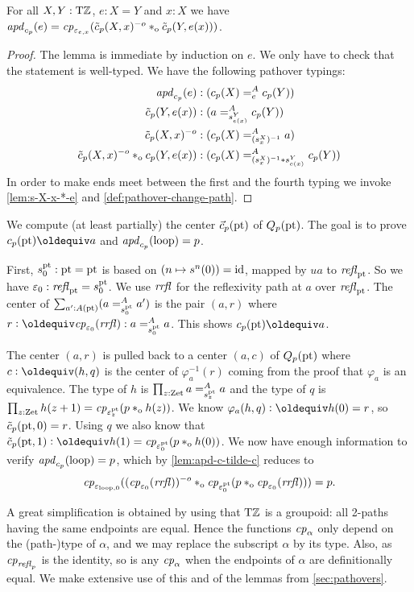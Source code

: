 \documentclass[a4,12pt]{amsart}
\begin{document}
\begin{lemma}\label{lem:apd-c-tilde-c}
For all $X,Y:{\mathrm{T}\mathbb{Z}}$, $e: X=Y$ and $x:X$ we have
$\mathop{{\it apd}_{c_p}}(e) = \mathit{cp}_{\varepsilon_{e,x}}
(\tilde c_p(X,x)^{-o}*_{\mathrm{o}} \tilde c_p(Y,e(x)))$.
\end{lemma}
\begin{proof}
The lemma is immediate by induction on $e$.
We only have to check that the statement is well-typed.
We have the following pathover typings:
\begin{align*}
\mathop{{\it apd}_{c_p}}(e) &: (c_p(X) =^A_e c_p(Y))\\
\tilde c_p(Y,e(x)) &:  (a =^A_{s^Y_{e(x)}} c_p(Y))\\
\tilde c_p(X,x)^{-o} &: (c_p(X) =^A_{(s^X_x)^{-1}} a)\\
\tilde c_p(X,x)^{-o} *_{\mathrm{o}} c_p(Y,e(x)) &: 
     (c_p(X) =^A_{(s^X_x)^{-1}* s^Y_{e(x)}} c_p(Y))\\
\end{align*}
In order to make ends meet between the first and the fourth typing
we invoke \cref{lem:s-X-x-*-e} and \cref{def:pathover-change-path}.
\end{proof}

We compute (at least partially) the center $\vec c_p({\mathord{\mathrm{pt}}})$ of $Q_p({\mathord{\mathrm{pt}}})$.
The goal is to prove $c_p(\pt)\jdeq a$ and $\mathop{{\it apd}_{c_p}}(\mathrm{loop})=p$.

First, $s^{\mathord{\mathrm{pt}}}_0: {\mathord{\mathrm{pt}}} = {\mathord{\mathrm{pt}}}$ is based on $(n\mapsto s^n(0)) = \mathord{\mathrm{id}}$, 
mapped by $ua$ to $\mathop{{\it refl}_{{\mathord{\mathrm{pt}}}}}$. So we have $\varepsilon_0 : \mathop{{\it refl}_{{\mathord{\mathrm{pt}}}}} = s^{\mathord{\mathrm{pt}}}_0$.
We use $\mathit{rrfl}$ for the reflexivity path at $a$ over $\mathop{{\it refl}_{{\mathord{\mathrm{pt}}}}}$.
The center of $\sum_{a':A({\mathord{\mathrm{pt}}})} (a =^A_{s^{\mathord{\mathrm{pt}}}_0} a')$ is the pair
$(a,r)$ where $r \defeq \cp{\varepsilon_0}(\rrfl): a =^A_{s^\pt_0} a$.
This shows $c_p(\pt)\jdeq a$.

The center $(a,r)$ is pulled back to a center $(a,c)$ of $Q_p({\mathord{\mathrm{pt}}})$ 
where $c\defeq(h,q)$ is the center of $\varphi_{a}^{-1}(r)$ coming 
from the proof that $\varphi_{a}$ is an equivalence.
The type of $h$ is $\prod_{z:\mathrm{Zet}} a =^A_{s^{\mathord{\mathrm{pt}}}_z} a$ and
the type of $q$ is $\prod_{z:\mathrm{Zet}} h(z+1) = \mathit{cp}_{\varepsilon^{\mathord{\mathrm{pt}}}_z}(p *_{\mathrm{o}} h(z))$.
We know $\varphi_{a}(h,q) \defeq h(0) = r$, so $\tilde c_p({\mathord{\mathrm{pt}}},0) = r$.
Using $q$ we also know that 
$\tilde c_p(\pt,1) \defeq h(1) = \cp{\varepsilon^\pt_0}(p \cto h(0))$.
We now have enough information to verify $\mathop{{\it apd}_{c_p}}(\mathrm{loop})=p$,
which by \cref{lem:apd-c-tilde-c} reduces to 
\[
\mathit{cp}_{\varepsilon_{\mathrm{loop},0}}
((\mathit{cp}_{\varepsilon_0}(\mathit{rrfl}))^{-o}*_{\mathrm{o}} 
\mathit{cp}_{\varepsilon^{\mathord{\mathrm{pt}}}_0}(p *_{\mathrm{o}} \mathit{cp}_{\varepsilon_0}(\mathit{rrfl}))) = p.
\]


A great simplification is obtained by using that ${\mathrm{T}\mathbb{Z}}$ is a groupoid:
all 2-paths having the same endpoints are equal.
Hence the functions $\mathit{cp}_{\alpha}$ only depend on the (path-)type
of $\alpha$, and we may replace the subscript $\alpha$ by its type.
Also, as $\mathit{cp}_{\mathop{{\it refl}_{p}}}$ is the identity, so is any $\mathit{cp}_{\alpha}$
when the endpoints of $\alpha$ are definitionally equal. 
We make extensive use of this and of the lemmas from \cref{sec:pathovers}.
\end{document}
